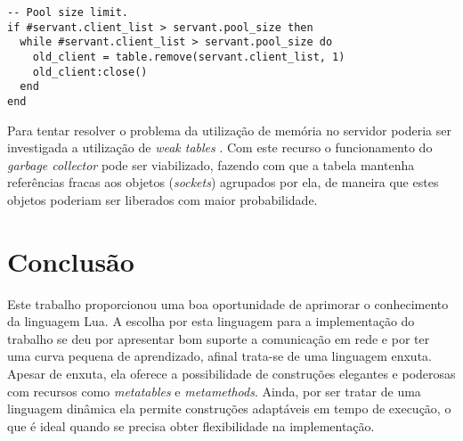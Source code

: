 \documentclass[11pt]{article}
\begin{document}
\begin{lstlisting}[caption={Pool de conexões},label={lst:connpool}]
-- Pool size limit.
if #servant.client_list > servant.pool_size then
  while #servant.client_list > servant.pool_size do
    old_client = table.remove(servant.client_list, 1)
    old_client:close()
  end
end
\end{lstlisting}

Para tentar resolver o problema da utilização de memória no servidor poderia ser
investigada a utilização de \textit{weak tables} \cite{weakt}. Com este recurso
o funcionamento do \textit{garbage collector} pode ser viabilizado, fazendo com
que a tabela mantenha referências fracas aos objetos (\textit{sockets})
agrupados por ela, de maneira que estes objetos poderiam ser liberados com maior
probabilidade.

\section{Conclusão}\label{sec:conclusion}

Este trabalho proporcionou uma boa oportunidade de aprimorar o conhecimento da
linguagem Lua. A escolha por esta linguagem para a implementação do trabalho se
deu por apresentar bom suporte a comunicação em rede e por ter uma curva pequena
de aprendizado, afinal trata-se de uma linguagem enxuta. Apesar de enxuta, ela
oferece a possibilidade de construções elegantes e poderosas com recursos como
\textit{metatables} e \textit{metamethods}. Ainda, por ser tratar de uma
linguagem dinâmica ela permite construções adaptáveis em tempo de execução, o
que é ideal quando se precisa obter flexibilidade na implementação.



\end{document}
